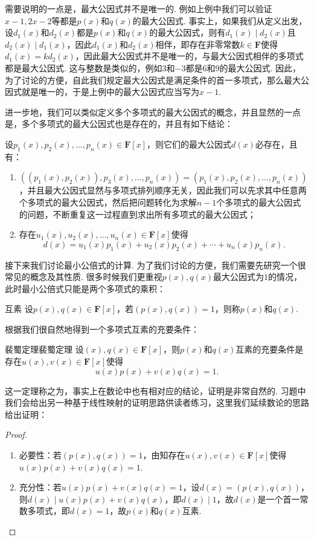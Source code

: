 需要说明的一点是，最大公因式并不是唯一的. 例如上例中我们可以验证$x-1,2x-2$等都是$p(x)$和$q(x)$的最大公因式. 事实上，如果我们从定义出发，设$d_1(x)$和$d_2(x)$都是$p(x)$和$q(x)$的最大公因式，则有$d_1(x)\mid d_2(x)$且$d_2(x)\mid d_1(x)$，因此$d_1(x)$和$d_2(x)$相伴，即存在非零常数$k\in\mathbf{F}$使得$d_1(x)=kd_2(x)$，因此最大公因式并不是唯一的，与最大公因式相伴的多项式都是最大公因式. 这与整数是类似的，例如$3$和$-3$都是$6$和$9$的最大公因式. 因此，为了讨论的方便，自此我们规定最大公因式是满足条件的首一多项式，那么最大公因式就是唯一的，于是上例中的最大公因式应当写为$x-1$.

进一步地，我们可以类似定义多个多项式的最大公因式的概念，并且显然的一点是，多个多项式的最大公因式也是存在的，并且有如下结论：
\begin{theorem}{}{}
    设$p_1(x),p_2(x),\ldots,p_n(x)\in\mathbf{F}[x]$，则它们的最大公因式$d(x)$必存在，且有：
    \begin{enumerate}
        \item $((p_1(x),p_2(x)),p_3(x),\ldots,p_n(x))=(p_1(x),p_2(x),\ldots,p_n(x))$，并且最大公因式显然与多项式排列顺序无关，因此我们可以先求其中任意两个多项式的最大公因式，然后把问题转化为求解$n-1$个多项式的最大公因式的问题，不断重复这一过程直到求出所有多项式的最大公因式；
        \item 存在$u_1(x),u_2(x),\ldots,u_n(x)\in\mathbf{F}[x]$使得
              \[d(x)=u_1(x)p_1(x)+u_2(x)p_2(x)+\cdots+u_n(x)p_n(x).\]
    \end{enumerate}
\end{theorem}

接下来我们讨论最小公倍式的计算. 为了我们讨论的方便，我们需要先研究一个很常见的概念及其性质. 很多时候我们更重视$p(x),q(x)$最大公因式为$1$的情况，此时最小公倍式只能是两个多项式的乘积：
\begin{definition}{互素}{}
    设$p(x),q(x)\in\mathbf{F}[x]$，若$(p(x),q(x))=1$，则称$p(x)$和$q(x)$.
\end{definition}
根据我们很自然地得到一个多项式互素的充要条件：
\begin{theorem}{裴蜀定理}{裴蜀定理} 
    设$(x),q(x)\in\mathbf{F}[x]$，则$p(x)$和$q(x)$互素的充要条件是存在$u(x),v(x)\in\mathbf{F}[x]$使得\[u(x)p(x)+v(x)q(x)=1.\]
\end{theorem}
这一定理称之为，事实上在数论中也有相对应的结论，证明是非常自然的. 习题中我们会给出另一种基于线性映射的证明思路供读者练习，这里我们延续数论的思路给出证明：
\begin{proof}
    \begin{enumerate}
        \item 必要性：若$(p(x),q(x))=1$，由知存在$u(x),v(x)\in\mathbf{F}[x]$使得$u(x)p(x)+v(x)q(x)=1$.
        \item 充分性：若$u(x)p(x)+v(x)q(x)=1$，设$d(x)=(p(x),q(x))$，则$d(x)\mid u(x)p(x)+v(x)q(x)$，即$d(x)\mid 1$，故$d(x)$是一个首一常数多项式，即$d(x)=1$，故$p(x)$和$q(x)$互素.
    \end{enumerate}
\end{proof}

